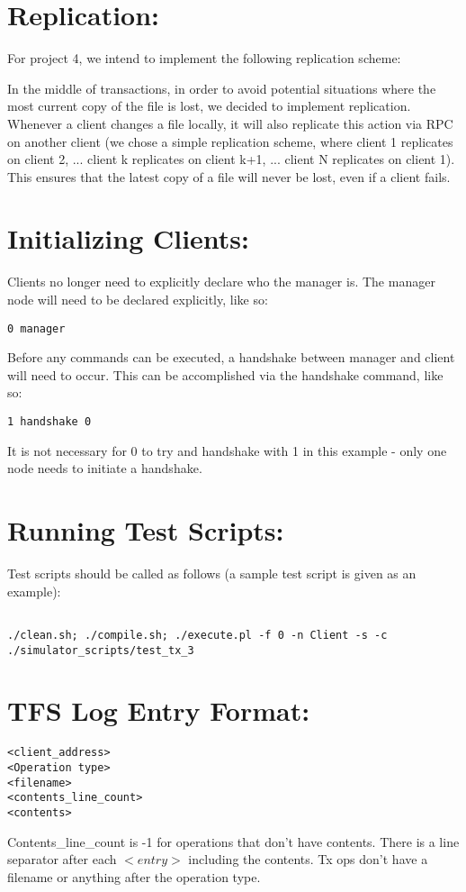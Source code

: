 \documentclass[11pt]{article}
\begin{document}
\section{Replication:} 

For project 4, we intend to implement the following replication scheme:

In the middle of transactions, in order to avoid potential situations where the most current copy of the file is lost, we decided to implement replication. Whenever a client changes a file locally,
it will also replicate this action via RPC on another client (we chose a simple replication scheme, where client 1 replicates on client 2, ... client k replicates on client k+1, ... client N replicates on client 1).
This ensures that the latest copy of a file will never be lost, even if a client fails.

\section{Initializing Clients:}

Clients no longer need to explicitly declare who the manager is. The manager node will need to be declared explicitly, like so:
\begin{verbatim}
0 manager
\end{verbatim}

Before any commands can be executed, a handshake between manager and client will need to occur. This can be accomplished via the handshake command, like so:
\begin{verbatim}
1 handshake 0
\end{verbatim}

It is not necessary for 0 to try and handshake with 1 in this example - only one node needs to initiate a handshake.

\section{Running Test Scripts:}

Test scripts should be called as follows (a sample test script is given as an example):

\begin{verbatim}

./clean.sh; ./compile.sh; ./execute.pl -f 0 -n Client -s -c ./simulator_scripts/test_tx_3 

\end{verbatim}

\section{TFS Log Entry Format:} 

\begin{verbatim}
<client_address>
<Operation type>
<filename>
<contents_line_count>
<contents>
\end{verbatim}

Contents\_line\_count is -1 for operations that don't have contents.
There is a line separator after each $<entry>$ including the contents.
Tx ops don't have a filename or anything after the operation type.
\end{document}
